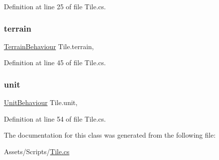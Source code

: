 Definition at line 25 of file Tile.\+cs.

\mbox{\label{class_tile_af45cdc1d322c30f61893f1e7de16e668}} 
\subsubsection{\texorpdfstring{terrain}{terrain}}
{\footnotesize\ttfamily \mbox{\hyperlink{class_terrain_behaviour}{Terrain\+Behaviour}} Tile.\+terrain\hspace{0.3cm}{\ttfamily [get]}, {\ttfamily [set]}}



Definition at line 45 of file Tile.\+cs.

\mbox{\label{class_tile_ac8a152fbb0fd0aec60d876b86bf1cb66}} 
\subsubsection{\texorpdfstring{unit}{unit}}
{\footnotesize\ttfamily \mbox{\hyperlink{class_unit_behaviour}{Unit\+Behaviour}} Tile.\+unit\hspace{0.3cm}{\ttfamily [get]}, {\ttfamily [set]}}



Definition at line 54 of file Tile.\+cs.



The documentation for this class was generated from the following file\+:\begin{DoxyCompactItemize}
\item 
Assets/\+Scripts/\mbox{\hyperlink{_tile_8cs}{Tile.\+cs}}\end{DoxyCompactItemize}
